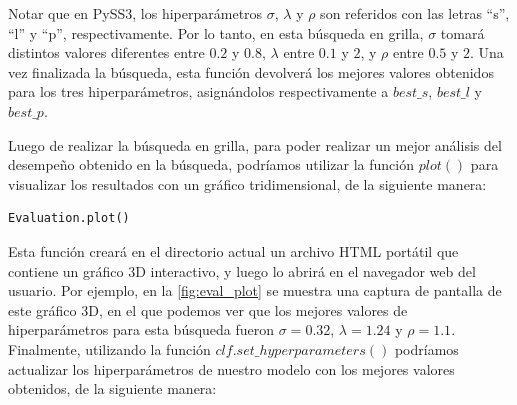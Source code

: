 Notar que en PySS3, los hiperparámetros $\sigma$, $\lambda$ y $\rho$  son referidos con las letras ``s'', ``l'' y ``p'', respectivamente.
Por lo tanto, en esta búsqueda en grilla, $\sigma$ tomará distintos valores diferentes entre $0.2$ y $0.8$, $\lambda$ entre $0.1$ y $2$, y $\rho$ entre $0.5$ y $2$.
Una vez finalizada la búsqueda, esta función devolverá los mejores valores obtenidos para los tres hiperparámetros, asignándolos respectivamente a $best\_s$, $best\_l$ y $best\_p$.

Luego de realizar la búsqueda en grilla, para poder realizar un mejor análisis del desempeño obtenido en la búsqueda, podríamos utilizar la función $plot()$ para visualizar los resultados con un gráfico tridimensional, de la siguiente manera:

\begin{verbatim}
Evaluation.plot()
\end{verbatim}

Esta función creará en el directorio actual un archivo HTML portátil que contiene un gráfico 3D interactivo, y luego lo abrirá en el navegador web del usuario.
Por ejemplo, en la \autoref{fig:eval_plot} se muestra una captura de pantalla de este gráfico 3D, en el que podemos ver que los mejores valores de hiperparámetros para esta búsqueda fueron $\sigma=0.32$, $\lambda=1.24$ y $\rho=1.1$.
Finalmente, utilizando la función $clf.set\_hyperparameters()$ podríamos actualizar los hiperparámetros de nuestro modelo con los mejores valores obtenidos, de la siguiente manera:

